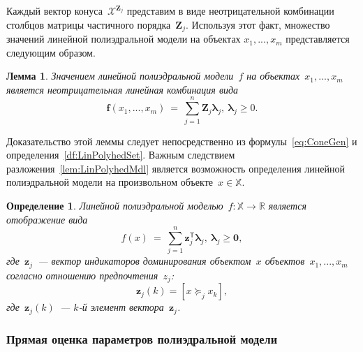 \documentclass{elsarticle}
\newcommand{\bz}{\mathbf{z}}
\newcommand{\bfx}{\mathbf{f}}
\newcommand{\bZ}{\mathbf{Z}}
\newcommand{\blambda}{\boldsymbol{\lambda}}
\newcommand{\cX}{\mathcal{X}}
\newcommand{\cY}{\mathcal{Y}}
\newcommand{\T}{^{\mathsf{T}}}
\newtheorem{df}{Определение}
\newtheorem{lemm}{Лемма}
\begin{document}
Каждый вектор конуса~$\cX^{\bZ_j}$ представим в виде неотрицательной комбинации столбцов матрицы частичного порядка~$\bZ_j$. Используя этот факт, множество значений линейной полиэдральной модели на объектах $x_1,...,x_m$ представляется следующим образом.
\begin{lemm}
Значением линейной полиэдральной модели~$f$ на объектах~$x_1,...,x_m$ является неотрицательная линейная комбинация вида
\begin{equation}
\bfx(x_1,...,x_m)~=~\sum\limits_{j=1}^n\bZ_j\blambda_j,~\blambda_j\geq 0.
\label{lem:LinPolyhedMdl}
\end{equation}
\end{lemm}
Доказательство этой леммы следует непосредственно из формулы~\eqref{eq:ConeGen} и определения~\eqref{df:LinPolyhedSet}.
Важным следствием разложения~\eqref{lem:LinPolyhedMdl} является возможность определения линейной полиэдральной модели на произвольном объекте~$x\in \mathbb{X}$.
\begin{df}
Линейной полиэдральной моделью~$f:\mathbb{X}\rightarrow\mathbb{R}$ является отображение вида
\begin{equation}
f(x)~=~\sum\limits_{j=1}^n\bz_j\T\blambda_j,~\blambda_j\geq \mathbf{0},
\label{df:LinPolyhedMdl}
\end{equation}
где~$\bz_j$~--- вектор индикаторов доминирования объектом~$x$ объектов~$x_1,...,x_m$ согласно отношению предпочтения~$z_j$:
\[
\bz_{j}(k)=[x\succeq_j x_k],
\]
где~$\bz_j(k)$~--- $k$-й элемент вектора~$\bz_j$.
\end{df}


\subsubsection{Прямая оценка параметров полиэдральной модели}
\label{subsec:ParEstDirect}
\end{document}
